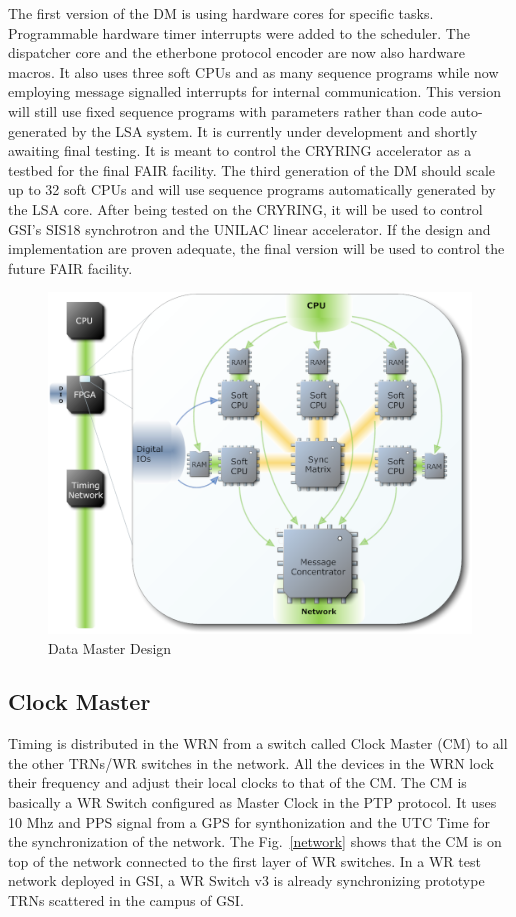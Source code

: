 \documentclass{JAC2003}
\begin{document}
The first version of the DM is using hardware cores for specific tasks.
Programmable hardware timer interrupts were added to the scheduler.
The dispatcher core and the etherbone protocol encoder are now also hardware
macros. It also uses three soft CPUs and as many sequence programs while now
employing message signalled interrupts for internal communication.
This version will still use fixed sequence programs with parameters rather
than code auto-generated by the LSA system. It is currently under development and
shortly awaiting final testing. It is meant to control the CRYRING accelerator
as a testbed for the final FAIR facility. The third generation of the DM should scale up to 32 soft CPUs and
will use sequence programs automatically generated by the LSA core. After being
tested on the CRYRING, it will be used to control GSI's SIS18 synchrotron and the UNILAC linear
accelerator. If the design and implementation are proven adequate, the final version will
be used to control the future FAIR facility.

\begin{figure}[htb]
   \centering
   \includegraphics*[scale=0.33]{THPPC092f2.eps}
   \caption{Data Master Design}
   \label{fatima}
\end{figure}


\subsection{Clock Master}
Timing is distributed in the WRN from a switch called Clock Master (CM) to all
the other TRNs/WR switches in the network. All the devices in the WRN lock their frequency 
and adjust their local clocks to that of the CM. The CM is basically a WR Switch
configured as Master Clock in the PTP protocol. It uses 10 Mhz and PPS signal from
a GPS for synthonization and the UTC Time for the synchronization of the
network. The Fig.~\ref{network} shows that the CM is on top of the network
connected to the first layer of WR switches. In a WR test network deployed in
GSI, a WR Switch v3 is already synchronizing prototype TRNs scattered in the
campus of GSI.  
\end{document}
